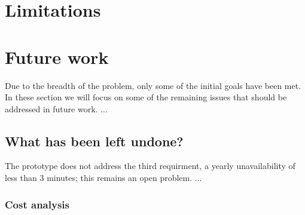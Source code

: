 

\section{Limitations}
\label{sec:limitations}




\section{Future work}
\label{sec:futureWork}










Due to the breadth of the problem, only some of the initial goals have been
met. In these section we will focus on some of the remaining issues that
should be addressed in future work. ...


\subsection{What has been left undone?}
\label{what-has-been-left-undone}


The prototype does not address the third requirment, \ie a yearly unavailability of less than 3 minutes; this remains an open problem. ...


\subsubsection{Cost analysis}


